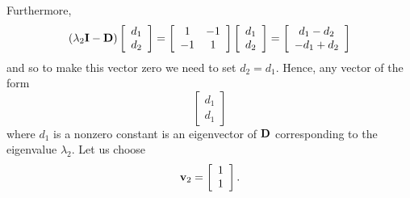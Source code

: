 \begin{solution}
\begin{enumerate}
Furthermore,
\[
\left(\lambda_2{\bf I}-{\bf D}\right)\left[\begin{array}{c}d_1 \\ d_2\end{array}\right]=\left[\begin{array}{cc}1 & -1\\-1 & 1\end{array}\right]\left[\begin{array}{c}d_1 \\ d_2\end{array}\right]=\left[\begin{array}{c}d_1-d_2 \\ -d_1+d_2\end{array}\right]
\]
and so to make this vector zero we need to set $d_2=d_1$. Hence, any vector of the form
\[
\left[\begin{array}{c}d_1 \\ d_1\end{array}\right]
\]
where $d_1$ is a nonzero constant is an eigenvector of ${\bf D}$ corresponding to the eigenvalue $\lambda_2$. Let us choose
\[
{\bf v}_2=\left[\begin{array}{c}1 \\ 1\end{array}\right].
\]


\end{enumerate}
\end{solution}
